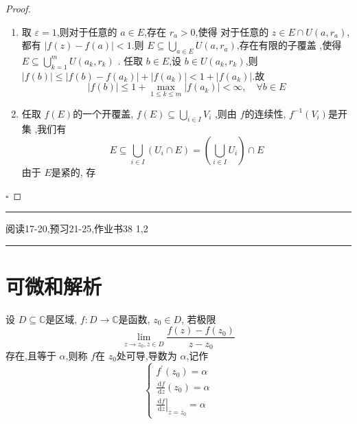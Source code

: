 \documentclass[../../复变函数.tex]{subfiles}
\begin{document}
\begin{proof}
    \begin{enumerate}
        \item 取 \(  \varepsilon = 1  \),则对于任意的 \(  a \in E  \),存在 \(  r_{a}>0  \),使得 对于任意的 \(  z \in E  \cap U\left( a,r_{a} \right) \),都有
         \(  \left| f\left( z \right)-f\left( a \right)   \right|   <1\).则 \(  E\subseteq \bigcup_{a \in E}U\left( a,r_{a} \right)   \),存在有限的子覆盖  ,使得 \(  E\subseteq  \bigcup_{k= 1}^{m} U\left( a_{k},r_{k} \right)    \)       .
        任取 \(  b\in E  \),设 \(  b \in U\left( a_{k},r_{k} \right)   \),则 \(  \left| f\left( b \right)  \right| \le  \left| f\left( b \right)-f\left( a_{k} \right)   \right|+ \left| f\left( a_{k} \right)  \right|< 1+ \left| f\left( a_{k} \right)  \right|      \).故 \[
        \left| f\left( b \right)  \right|\le  1+ \max _{1\le k\le m}\left| f\left( a_{k} \right)  \right|<\infty, \quad \forall b \in E  
        \]   
        \item 任取 \(  f\left( E \right)   \)的一个开覆盖, \(  f\left( E \right)\subseteq \bigcup_{i\in I}V_{i}    \)  ,则由 \(  f  \)的连续性,  \(  f^{-1} \left( V_{i} \right)   \)是开集 ,我们有 \[
        E\subseteq  \bigcup_{i \in I}\left( U_{i}\cap E \right) = \left( \bigcup_{i \in I}U_{i}  \right)\cap E    
        \]由于 \(  E  \)是紧的, 存 
    \end{enumerate}
    

    \hfill $\square$
\end{proof}


\hspace*{\fill} 
\hrule
\hspace*{\fill}

阅读17-20,预习21-25,作业书38 1,2



\hspace*{\fill} 
\hrule
\hspace*{\fill}

\section{可微和解析}

\begin{definition}
    设 \(  D\subseteq \mathbb{C}   \)是区域, \(  f: D\to \mathbb{C}   \)是函数, \(  z_0 \in D  \),
    若极限 \[
    \lim_{z\to z_0 ,z \in D} \frac{f\left( z \right)-f\left( z_0 \right)   }{ z-z_0} 
    \]存在,且等于 \(  \alpha   \),则称 \(  f  \)在 \(  z_0  \)处可导,导数为 \(  \alpha   \),记作 \[
    \begin{cases} f^{\prime} \left( z_0 \right)= \alpha \\ 
     \frac{\,\mathrm{d} f }{\,\mathrm{d} z }\left( z_0 \right)= \alpha \\ 
      \left. \frac{\,\mathrm{d} f }{\,\mathrm{d} z }  \right|_{z= z_0} =  \alpha     \end{cases} 
    \]       
\end{definition}
\end{document}
